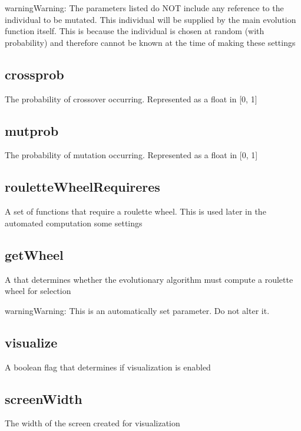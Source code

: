 \documentclass[letterpaper,10pt,english]{sphinxmanual}
\begin{document}
\begin{notice}{warning}{Warning:}
The parameters listed do NOT include any reference to the individual to be mutated. This individual will be supplied by the main evolution function itself. This is because the individual is chosen at random (with probability) and therefore cannot be known at the time of making these settings
\end{notice}


\subsection{crossprob}
\label{settings.py:crossprob}
The probability of crossover occurring. Represented as a float in {[}0, 1{]}


\subsection{mutprob}
\label{settings.py:mutprob}
The probability of mutation occurring. Represented as a float in {[}0, 1{]}


\subsection{rouletteWheelRequireres}
\label{settings.py:roulettewheelrequireres}
A set of functions that require a roulette wheel. This is used later in the automated computation some settings


\subsection{getWheel}
\label{settings.py:getwheel}
A  that determines whether the evolutionary algorithm must compute a roulette wheel for selection

\begin{notice}{warning}{Warning:}
This is an automatically set parameter. Do not alter it.
\end{notice}


\subsection{visualize}
\label{settings.py:visualize}
A boolean flag that determines if visualization is enabled


\subsection{screenWidth}
\label{settings.py:screenwidth}
The width of the screen created for visualization
\end{document}

